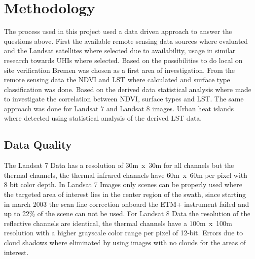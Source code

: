 \documentclass[a4paper, english]{article}
\begin{document}
\section{Methodology}
The process used in this project used a data driven approach to answer the questions above. 
First the available remote sensing data sources where evaluated and the Landsat satellites where selected due to availability, usage in similar research towards \acp{UHI}\cite{Weng2004}\cite{Weng2003}\cite{Jumari2023} where selected.
Based on %
the possibilities to do local on site verification Bremen was chosen as a first area of investigation. 
From the remote sensing data the \ac{NDVI} and \ac{LST} where calculated and surface type classification was done. 
Based on the derived data statistical analysis where made to investigate the correlation between \ac{NDVI}, surface types and \ac{LST}. 
The same approach was done for Landsat 7 and Landsat 8 images. 
Urban heat islands where detected using statistical analysis of the derived \ac{LST} data. 
\subsection{Data Quality}
The Landsat 7 Data has a resolution of 30m~x~30m for all channels but the thermal channels, the thermal infrared channels have 60m~x~60m per pixel\cite{Landsat7Specs} with 8 bit color depth. 
In Landsat 7  Images only scenes can be properly used where the targeted area of interest lies in the center region of the swath, since starting in march 2003 the scan line correction onboard the ETM+ instrument failed and up to 22\% of the scene can not be used\cite{Landsat7Specs}.
For Landsat 8 Data the resolution of the reflective channels are identical, the thermal channels have a 100m~x~100m resolution with a higher grayscale color range per pixel of 12-bit\cite{Landsat8Specs}.
Errors due to cloud shadows\cite[p.14]{EROASC2013} where eliminated by using images with no clouds for the areas of interest.
\newpage
\end{document}
